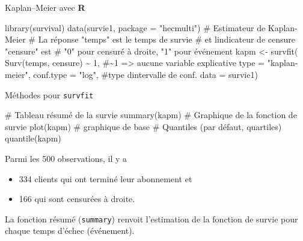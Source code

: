 \documentclass[
  ignorenonframetext,
]{beamer}
\newenvironment{Shaded}{\begin{snugshade}}{\end{snugshade}}
\newcommand{\AttributeTok}[1]{\textcolor[rgb]{0.40,0.45,0.13}{#1}}
\newcommand{\CommentTok}[1]{\textcolor[rgb]{0.37,0.37,0.37}{#1}}
\newcommand{\DecValTok}[1]{\textcolor[rgb]{0.68,0.00,0.00}{#1}}
\newcommand{\FunctionTok}[1]{\textcolor[rgb]{0.28,0.35,0.67}{#1}}
\newcommand{\NormalTok}[1]{\textcolor[rgb]{0.00,0.23,0.31}{#1}}
\newcommand{\OtherTok}[1]{\textcolor[rgb]{0.00,0.23,0.31}{#1}}
\newcommand{\SpecialCharTok}[1]{\textcolor[rgb]{0.37,0.37,0.37}{#1}}
\newcommand{\StringTok}[1]{\textcolor[rgb]{0.13,0.47,0.30}{#1}}
\providecommand{\tightlist}{%
  \setlength{\itemsep}{0pt}\setlength{\parskip}{0pt}}
\begin{document}
\begin{frame}[fragile]{Kaplan--Meier avec \textbf{R}}
\protect{}\label{kaplanmeier-avec-r}
\begin{Shaded}
\begin{Highlighting}[numbers=left,,]
\FunctionTok{library}\NormalTok{(survival)}
\FunctionTok{data}\NormalTok{(survie1, }\AttributeTok{package =} \StringTok{"hecmulti"}\NormalTok{)}
\CommentTok{\# Estimateur de Kaplan{-}Meier}
\CommentTok{\# La réponse "temps" est le temps de survie }
\CommentTok{\# et l\textquotesingle{}indicateur de censure "censure" est}
\CommentTok{\# "0" pour censuré à droite, "1" pour événement}
\NormalTok{kapm }\OtherTok{\textless{}{-}} \FunctionTok{survfit}\NormalTok{(}
  \FunctionTok{Surv}\NormalTok{(temps, censure) }\SpecialCharTok{\textasciitilde{}} \DecValTok{1}\NormalTok{, }
  \CommentTok{\#\textasciitilde{}1 =\textgreater{} aucune variable explicative}
  \AttributeTok{type =} \StringTok{"kaplan{-}meier"}\NormalTok{, }
  \AttributeTok{conf.type =} \StringTok{"log"}\NormalTok{, }\CommentTok{\#type d\textquotesingle{}intervalle de conf.}
  \AttributeTok{data =}\NormalTok{ survie1)}
\end{Highlighting}
\end{Shaded}
\end{frame}

\begin{frame}[fragile]{Méthodes pour \texttt{survfit}}
\protect{}\label{muxe9thodes-pour-survfit}
\begin{Shaded}
\begin{Highlighting}[numbers=left,,]
\CommentTok{\# Tableau résumé de la survie}
\FunctionTok{summary}\NormalTok{(kapm)  }
\CommentTok{\# Graphique de la fonction de survie}
\FunctionTok{plot}\NormalTok{(kapm) }\CommentTok{\# graphique de base}
\CommentTok{\# Quantiles (par défaut, quartiles)}
\FunctionTok{quantile}\NormalTok{(kapm)}
\end{Highlighting}
\end{Shaded}

Parmi les 500 observations, il y a

\begin{itemize}
\tightlist
\item
  334 clients qui ont terminé leur abonnement et
\item
  166 qui sont censurées à droite.
\end{itemize}

La fonction résumé (\texttt{summary}) renvoit l'estimation de la
fonction de survie pour chaque temps d'échec (événement).
\end{frame}
\end{document}
